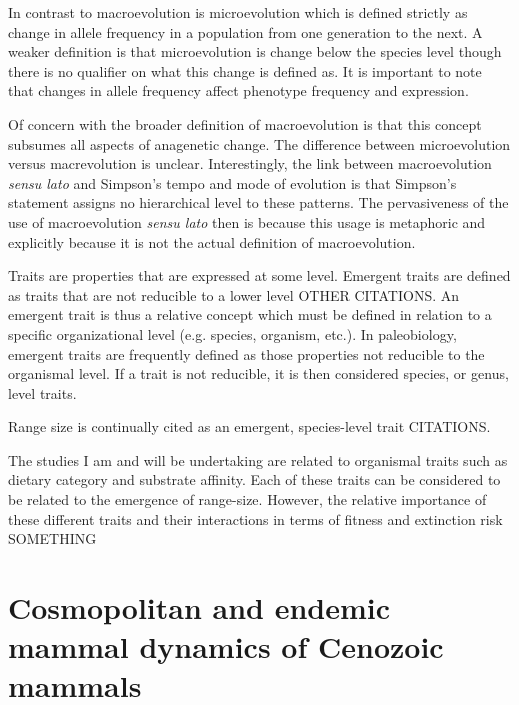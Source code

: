 \documentclass[12pt,letterpaper]{article}
\begin{document}
In contrast to macroevolution is microevolution \citep{Simpson1944,Foote2007b} which is defined strictly as change in allele frequency in a population from one generation to the next. A weaker definition is that microevolution is change below the species level \citep{Foote2007b} though there is no qualifier on what this change is defined as. It is important to note that changes in allele frequency affect phenotype frequency and expression.


Of concern with the broader definition of macroevolution is that this concept subsumes all aspects of anagenetic change. The difference between microevolution versus macrevolution is unclear. Interestingly, the link between macroevolution \textit{sensu lato} and Simpson's tempo and mode of evolution is that Simpson's statement assigns no hierarchical level to these patterns. The pervasiveness of the use of macroevolution \textit{sensu lato} then is because this usage is metaphoric and explicitly because it is not the actual definition of macroevolution.

Traits are properties that are expressed at some level. Emergent traits are defined as traits that are not reducible to a lower level \citep{Jablonski2008a}OTHER CITATIONS. An emergent trait is thus a relative concept which must be defined in relation to a specific organizational level (e.g. species, organism, etc.). In paleobiology, emergent traits are frequently defined as those properties not reducible to the organismal level. If a trait is not reducible, it is then considered species, or genus, level traits.

Range size is continually cited as an emergent, species-level trait CITATIONS. 

The studies I am and will be undertaking are related to organismal traits such as dietary category and substrate affinity. Each of these traits can be considered to be related to the emergence of range-size. However, the relative importance of these different traits and their interactions in terms of fitness and extinction risk SOMETHING


\section{Cosmopolitan and endemic mammal dynamics of Cenozoic mammals}
\end{document}
